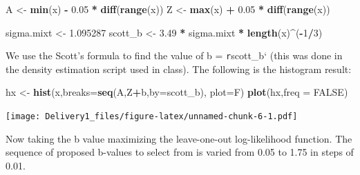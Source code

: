 \documentclass[
]{article}
\newenvironment{Shaded}{\begin{snugshade}}{\end{snugshade}}
\newcommand{\AttributeTok}[1]{\textcolor[rgb]{0.13,0.29,0.53}{#1}}
\newcommand{\ConstantTok}[1]{\textcolor[rgb]{0.56,0.35,0.01}{#1}}
\newcommand{\DecValTok}[1]{\textcolor[rgb]{0.00,0.00,0.81}{#1}}
\newcommand{\FloatTok}[1]{\textcolor[rgb]{0.00,0.00,0.81}{#1}}
\newcommand{\FunctionTok}[1]{\textcolor[rgb]{0.13,0.29,0.53}{\textbf{#1}}}
\newcommand{\NormalTok}[1]{#1}
\newcommand{\OtherTok}[1]{\textcolor[rgb]{0.56,0.35,0.01}{#1}}
\newcommand{\SpecialCharTok}[1]{\textcolor[rgb]{0.81,0.36,0.00}{\textbf{#1}}}
\begin{document}
\begin{Shaded}
\begin{Highlighting}[]
\NormalTok{A }\OtherTok{\textless{}{-}} \FunctionTok{min}\NormalTok{(x) }\SpecialCharTok{{-}} \FloatTok{0.05} \SpecialCharTok{*} \FunctionTok{diff}\NormalTok{(}\FunctionTok{range}\NormalTok{(x))}
\NormalTok{Z }\OtherTok{\textless{}{-}} \FunctionTok{max}\NormalTok{(x) }\SpecialCharTok{+} \FloatTok{0.05} \SpecialCharTok{*} \FunctionTok{diff}\NormalTok{(}\FunctionTok{range}\NormalTok{(x))}

\NormalTok{sigma.mixt }\OtherTok{\textless{}{-}} \FloatTok{1.095287}
\NormalTok{scott\_b }\OtherTok{\textless{}{-}} \FloatTok{3.49} \SpecialCharTok{*}\NormalTok{ sigma.mixt }\SpecialCharTok{*} \FunctionTok{length}\NormalTok{(x)}\SpecialCharTok{\^{}}\NormalTok{(}\SpecialCharTok{{-}}\DecValTok{1}\SpecialCharTok{/}\DecValTok{3}\NormalTok{)}
\end{Highlighting}
\end{Shaded}

We use the Scott's formula to find the value of b = \texttt{r}scott\_b`
(this was done in the density estimation script used in class). The
following is the histogram result:

\begin{Shaded}
\begin{Highlighting}[]
\NormalTok{hx }\OtherTok{\textless{}{-}} \FunctionTok{hist}\NormalTok{(x,}\AttributeTok{breaks=}\FunctionTok{seq}\NormalTok{(A,Z}\SpecialCharTok{+}\NormalTok{b,}\AttributeTok{by=}\NormalTok{scott\_b), }\AttributeTok{plot=}\NormalTok{F)}
\FunctionTok{plot}\NormalTok{(hx,}\AttributeTok{freq =} \ConstantTok{FALSE}\NormalTok{)}
\end{Highlighting}
\end{Shaded}

\texttt{[image: Delivery1\_files/figure-latex/unnamed-chunk-6-1.pdf]}

Now taking the b value maximizing the leave-one-out log-likelihood
function. The sequence of proposed b-values to select from is varied
from 0.05 to 1.75 in steps of 0.01.
\end{document}
